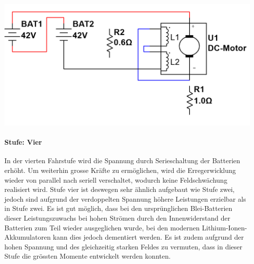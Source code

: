 \begin{minipage}{0.49\textwidth}
	\includegraphics[width=\columnwidth]{images/Stufenschalter/Stufe_4.png}%
\end{minipage}
\begin{minipage}{0.5\textwidth}
	\paragraph{Stufe: Vier}
	In der vierten Fahrstufe wird die Spannung durch Serieschaltung der Batterien erhöht. Um weiterhin grosse Kräfte zu ermöglichen, wird die Erregerwicklung wieder von parallel nach seriell verschaltet, wodurch keine Feldschwächung realisiert wird. Stufe vier ist deswegen sehr ähnlich aufgebaut wie Stufe zwei, jedoch sind aufgrund der verdoppelten Spannung höhere Leistungen erzielbar als in Stufe zwei. Es ist gut möglich, dass bei den ursprünglichen Blei-Batterien dieser Leistungszuwachs bei hohen Strömen durch den Innenwiderstand der Batterien zum Teil wieder ausgeglichen wurde, bei den modernen Lithium-Ionen-Akkumulatoren kann dies jedoch dementiert werden. Es ist zudem aufgrund der hohen Spannung und des gleichzeitig starken Feldes zu vermuten, dass in dieser Stufe die grössten Momente entwickelt werden konnten.
\end{minipage}

